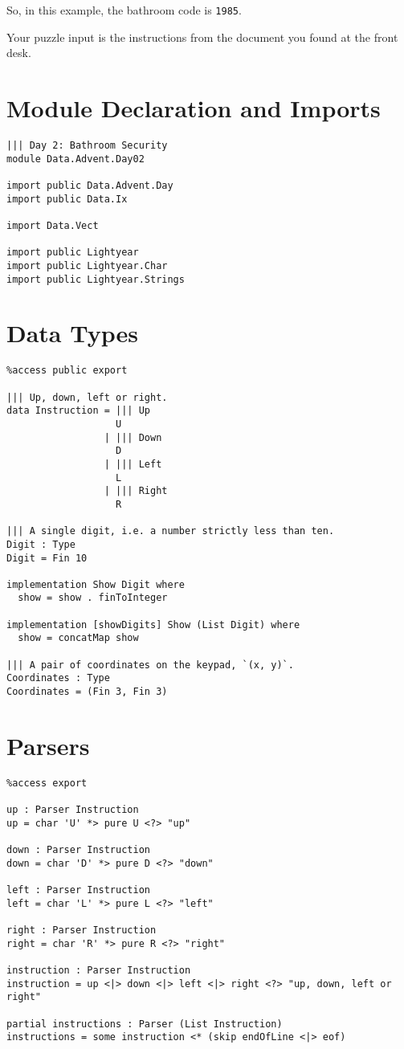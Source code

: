 \documentclass[b5paper,twoside]{amsbook}
\begin{document}
So, in this example, the bathroom code is \texttt{1985}.

Your puzzle input is the instructions from the document you found at the
front desk.

\section{Module Declaration and
Imports}\label{module-declaration-and-imports}

\begin{verbatim}
||| Day 2: Bathroom Security
module Data.Advent.Day02

import public Data.Advent.Day
import public Data.Ix

import Data.Vect

import public Lightyear
import public Lightyear.Char
import public Lightyear.Strings
\end{verbatim}

\section{Data Types}\label{data-types}

\begin{verbatim}
%access public export

||| Up, down, left or right.
data Instruction = ||| Up
                   U
                 | ||| Down
                   D
                 | ||| Left
                   L
                 | ||| Right
                   R

||| A single digit, i.e. a number strictly less than ten.
Digit : Type
Digit = Fin 10

implementation Show Digit where
  show = show . finToInteger

implementation [showDigits] Show (List Digit) where
  show = concatMap show

||| A pair of coordinates on the keypad, `(x, y)`.
Coordinates : Type
Coordinates = (Fin 3, Fin 3)
\end{verbatim}

\newpage

\section{Parsers}\label{parsers}

\begin{verbatim}
%access export

up : Parser Instruction
up = char 'U' *> pure U <?> "up"

down : Parser Instruction
down = char 'D' *> pure D <?> "down"

left : Parser Instruction
left = char 'L' *> pure L <?> "left"

right : Parser Instruction
right = char 'R' *> pure R <?> "right"

instruction : Parser Instruction
instruction = up <|> down <|> left <|> right <?> "up, down, left or right"

partial instructions : Parser (List Instruction)
instructions = some instruction <* (skip endOfLine <|> eof)
\end{verbatim}
\end{document}
